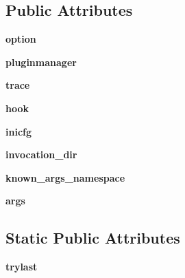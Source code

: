 \subsection*{Public Attributes}
\begin{DoxyCompactItemize}
\item 
\mbox{\label{class__pytest_1_1config_1_1_config_ae89d8cff7e7d483be65f3951b76f5429}} 
{\bfseries option}
\item 
\mbox{\label{class__pytest_1_1config_1_1_config_aeb0b43fe2a3d14980dc463e769141b77}} 
{\bfseries pluginmanager}
\item 
\mbox{\label{class__pytest_1_1config_1_1_config_a3e4848cc05c6102839769f407505418d}} 
{\bfseries trace}
\item 
\mbox{\label{class__pytest_1_1config_1_1_config_ad3284814f220c677d3d5c4cba0f63d95}} 
{\bfseries hook}
\item 
\mbox{\label{class__pytest_1_1config_1_1_config_acf74be1b0ee155b54f7a0e0be4859f43}} 
{\bfseries inicfg}
\item 
\mbox{\label{class__pytest_1_1config_1_1_config_acb5a6251fac8a70ba3d2924a502bf3e2}} 
{\bfseries invocation\+\_\+dir}
\item 
\mbox{\label{class__pytest_1_1config_1_1_config_afdf74fdd38a6920f710f1b44dd7448be}} 
{\bfseries known\+\_\+args\+\_\+namespace}
\item 
\mbox{\label{class__pytest_1_1config_1_1_config_a76fc2552cfa75d2141185a07f33ae0f1}} 
{\bfseries args}
\end{DoxyCompactItemize}
\subsection*{Static Public Attributes}
\begin{DoxyCompactItemize}
\item 
\mbox{\label{class__pytest_1_1config_1_1_config_a588c6b024032ef139530dc31c4649e1d}} 
{\bfseries trylast}
\end{DoxyCompactItemize}


